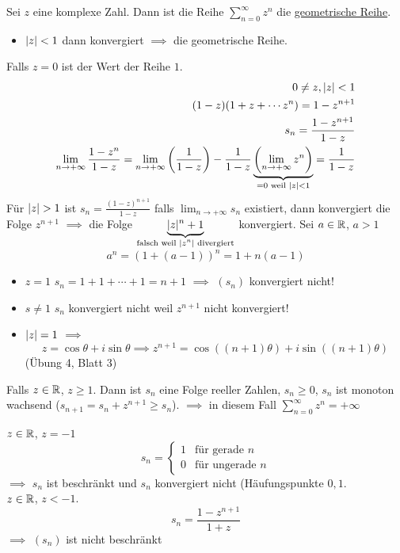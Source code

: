 \begin{Bsp}
  Sei $z$ eine komplexe Zahl. Dann ist die Reihe $\sum^\infty_{n=0}z^n$ die \ul{geometrische Reihe}.
  \begin{itemize}
    \item $\mathopen| z \mathclose|<1$ dann konvergiert $\implies$ die geometrische Reihe.
  \end{itemize}
  Falls $z=0$ ist der Wert der Reihe $1$.
  \begin{align*}
    0\neq z, \mathopen| z \mathclose|<1\\
    (1-z)(1+z+\cdots z^n)=1-z^{n+1}\\
    s_n=\frac{1-z^{n+1}}{1-z}\\
    \lim_{n\to+\infty}\frac{1-z^n}{1-z}=\lim_{n\to+\infty}\left( \frac{1}{1-z} \right)-\frac{1}{1-z}\underbrace{\left( \lim_{n\to+\infty}z^n \right)}_{=0 \text{ weil } \mathopen| z \mathclose|<1}=\frac{1}{1-z}
  \end{align*}
  Für $\abs{z}>1$ ist $s_n=\frac{(1-z)^{n+1}}{1-z}$ falls $\lim_{n\to+\infty}s_n$ existiert, dann konvergiert die Folge $z^{n+1}$ $\implies$ die Folge $\underbrace{\mathopen| z \mathclose|^n+1}_{\text{falsch weil $\mathopen| z^n \mathclose|$ divergiert}}$ konvergiert. Sei $a\in\mathbb{R}$, $a>1$
  \[a^n=(1+(a-1))^n=1+n(a-1)\]
  \begin{itemize}
    \item $z=1$ $s_n=1+1+\cdots+1=n+1$ $\implies$ $(s_n)$ konvergiert nicht!
    \item $s\neq 1$ $s_n$ konvergiert nicht weil $z^{n+1}$ nicht konvergiert!
    \item $\mathopen| z \mathclose|=1$ $\implies$ 
      \[z=\cos\theta+i\sin\theta\implies z^{n+1}=\cos((n+1)\theta)+i\sin((n+1)\theta)\]
      (Übung 4, Blatt 3)
  \end{itemize}
  \begin{Bem}
    Falls $z\in\mathbb{R}$, $z\geq 1$. Dann ist $s_n$ eine Folge reeller Zahlen, $s_n\geq 0$, $s_n$ ist monoton wachsend ($s_{n+1}=s_n+z^{n+1}\geq s_n$). $\implies$ in diesem Fall $\sum^\infty_{n=0}z^n=+\infty$
  \end{Bem}
  $z\in\mathbb{R}$, $z=-1$
  \[s_n=\begin{cases}
    1&\text{für gerade $n$}\\
    0&\text{für ungerade $n$}
  \end{cases}\]
  $\implies$ $s_n$ ist beschränkt und $s_n$ konvergiert nicht (Häufungspunkte ${0,1}$.\\
  $z\in\mathbb{R}$, $z<-1$.
  \[s_n=\frac{1-z^{n+1}}{1+z}\]
  $\implies$ $(s_n)$ ist nicht beschränkt
\end{Bsp}
